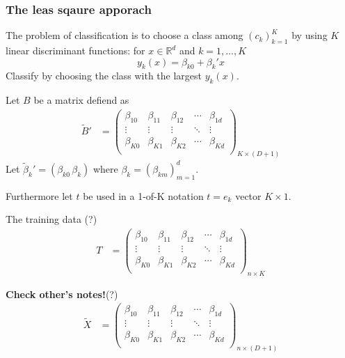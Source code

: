 \documentclass[a4paper]{article}
\newcommand{\Real}{\mathbb{R}}
\begin{document}

\subsubsection{The leas sqaure apporach} %
\label{ssub:the_leas_sqaure_apporach}

The problem of classification is to choose a class among $(c_k)_{k=1}^K$ by using
$K$ linear discriminant functions: for $x\in \Real^d$ and $k=1,\ldots, K$
\[y_k(x) = \beta_{k0} + \beta_k'x\]
Classify by choosing the class with the largest $y_k(x)$.

Let $B$ be a matrix defiend as 
\begin{align*}
\tilde{B}' &= \begin{pmatrix}
	\beta_{10} 	& \beta_{11} 		& \beta_{12} 		& \cdots & \beta_{1d} \\
	\vdots 	& \vdots	& \vdots 	& \ddots & \vdots \\
	\beta_{K0} 	& \beta_{K1} 		& \beta_{K2} 		& \cdots & \beta_{Kd} \\
	\end{pmatrix}_{K\times (D+1)}
\end{align*}
Let $\tilde{\beta}_k' = (\beta_{k0}\, \beta_k)$ where $\beta_k = (\beta_{km})_{m=1}^d$.

Furthermore let $t$ be used in a 1-of-K notation $t = e_k$ vector $K\times 1$.

The training data (?)
\begin{align*}
T &= \begin{pmatrix}
	\beta_{10} 	& \beta_{11} 		& \beta_{12} 		& \cdots & \beta_{1d} \\
	\vdots 	& \vdots	& \vdots 	& \ddots & \vdots \\
	\beta_{K0} 	& \beta_{K1} 		& \beta_{K2} 		& \cdots & \beta_{Kd} \\
	\end{pmatrix}_{n\times K}
\end{align*}

\textbf{Check other's notes!}(?)
\begin{align*}
\tilde{X} &= \begin{pmatrix}
	\beta_{10} 	& \beta_{11} 		& \beta_{12} 		& \cdots & \beta_{1d} \\
	\vdots 	& \vdots	& \vdots 	& \ddots & \vdots \\
	\beta_{K0} 	& \beta_{K1} 		& \beta_{K2} 		& \cdots & \beta_{Kd} \\
	\end{pmatrix}_{n\times (D+1)}
\end{align*}
\end{document}
